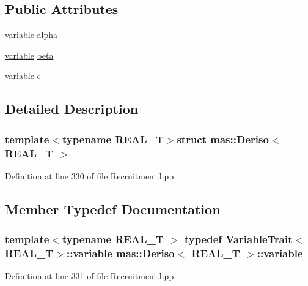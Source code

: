 \subsection*{Public Attributes}
\begin{DoxyCompactItemize}
\item 
\hyperlink{structmas_1_1_deriso_a458705874e9be66739422da45db21ff0}{variable} \hyperlink{structmas_1_1_deriso_a9fc2133e60c6362ac0bf4f9c18b98410}{alpha}
\item 
\hyperlink{structmas_1_1_deriso_a458705874e9be66739422da45db21ff0}{variable} \hyperlink{structmas_1_1_deriso_ae907bcd71c5768501c1eb84083e24b14}{beta}
\item 
\hyperlink{structmas_1_1_deriso_a458705874e9be66739422da45db21ff0}{variable} \hyperlink{structmas_1_1_deriso_ad1977b4273fd41597b100dcbee6c1fc0}{c}
\end{DoxyCompactItemize}


\subsection{Detailed Description}
\subsubsection*{template$<$typename R\-E\-A\-L\-\_\-\-T$>$struct mas\-::\-Deriso$<$ R\-E\-A\-L\-\_\-\-T $>$}



Definition at line 330 of file Recruitment.\-hpp.



\subsection{Member Typedef Documentation}
\hypertarget{structmas_1_1_deriso_a458705874e9be66739422da45db21ff0}{
\subsubsection[{variable}]{\setlength{\rightskip}{0pt plus 5cm}template$<$typename R\-E\-A\-L\-\_\-\-T $>$ typedef {\bf Variable\-Trait}$<$R\-E\-A\-L\-\_\-\-T$>$\-::{\bf variable} {\bf mas\-::\-Deriso}$<$ R\-E\-A\-L\-\_\-\-T $>$\-::{\bf variable}}}\label{structmas_1_1_deriso_a458705874e9be66739422da45db21ff0}


Definition at line 331 of file Recruitment.\-hpp.



